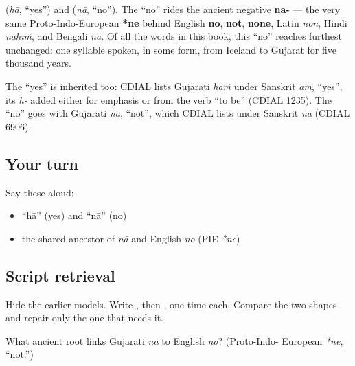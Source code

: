 \begin{cousinweb}
\textbf{} (\emph{hā}, \textquotedblleft{}yes\textquotedblright{}) and \textbf{} (\emph{nā}, \textquotedblleft{}no\textquotedblright{}). The \textquotedblleft{}no\textquotedblright{} rides the ancient negative \textbf{na-} — the very same Proto-Indo-European \textbf{*ne} behind English \textbf{no}, \textbf{not}, \textbf{none}, Latin \emph{nōn}, Hindi \emph{nahīṁ}, and Bengali \emph{nā}. Of all the words in this book, this \textquotedblleft{}no\textquotedblright{} reaches furthest unchanged: one syllable spoken, in some form, from Iceland to Gujarat for five thousand years.

The \textquotedblleft{}yes\textquotedblright{} is inherited too: CDIAL lists Gujarati \emph{hāṁ} under Sanskrit \emph{ām}, \textquotedblleft{}yes\textquotedblright{}, its \emph{h-} added either for emphasis or from the verb \textquotedblleft{}to be\textquotedblright{} (CDIAL 1235). The \textquotedblleft{}no\textquotedblright{} goes with Gujarati \emph{na}, \textquotedblleft{}not\textquotedblright{}, which CDIAL lists under Sanskrit \emph{na} (CDIAL 6906).
\end{cousinweb}

\subsection*{Your turn}
Say these aloud:

\begin{itemize}
\raggedright
  \item \textquotedblleft{}hā\textquotedblright{} (yes) and \textquotedblleft{}nā\textquotedblright{} (no)
  \item the shared ancestor of \emph{nā} and English \emph{no} (PIE \emph{*ne})
\end{itemize}

\subsection*{Script retrieval}
Hide the earlier models. Write \textbf{}, then \textbf{}, one time each. Compare the two shapes and repair only the one that needs it.

\begin{tcolorbox}[breakable,colback=teal!4,colframe=teal!35!black,title={Before you move on}]
What ancient root links Gujarati \emph{nā} to English \emph{no}? (Proto-Indo- European \emph{*ne}, \textquotedblleft{}not.\textquotedblright{})
\end{tcolorbox}
